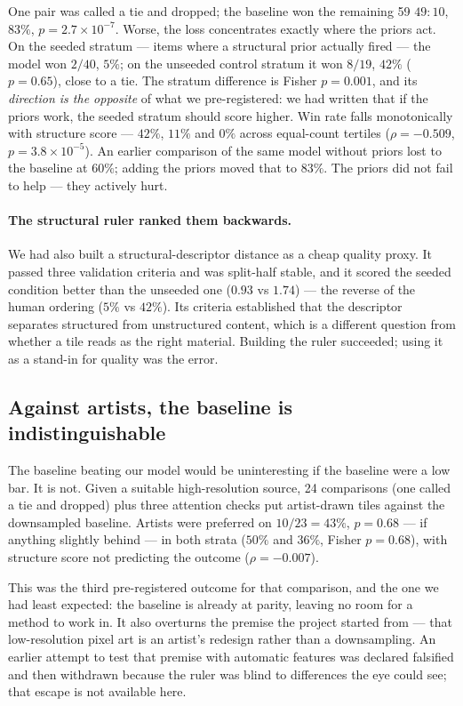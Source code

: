 \documentclass{article}
\begin{document}
One pair was called a tie and dropped; the baseline won the remaining 59
$49{:}10$, $83\%$, $p{=}2.7\times10^{-7}$. Worse, the loss concentrates
exactly where the priors act. On the seeded stratum --- items where a
structural prior actually fired --- the model won $2/40$, $5\%$; on the
unseeded control stratum it won $8/19$, $42\%$ ($p{=}0.65$), close to a tie.
The stratum difference is Fisher $p{=}0.001$, and its \emph{direction is the
opposite} of what we pre-registered: we had written that if the priors work,
the seeded stratum should score higher. Win rate falls monotonically with
structure score --- $42\%$, $11\%$ and $0\%$ across equal-count tertiles
($\rho{=}-0.509$, $p{=}3.8\times10^{-5}$). An earlier comparison of the same model
without priors lost to the baseline at $60\%$; adding the priors moved that to $83\%$.
The priors did not fail to help --- they actively hurt.

\paragraph{The structural ruler ranked them backwards.} We had also built a
structural-descriptor distance as a cheap quality proxy. It passed three
validation criteria and was split-half stable, and it scored the seeded
condition better than the unseeded one ($0.93$ vs $1.74$) --- the reverse of
the human ordering ($5\%$ vs $42\%$). Its criteria established that the
descriptor separates structured from unstructured content, which is a
different question from whether a tile reads as the right material. Building
the ruler succeeded; using it as a stand-in for quality was the error.

\subsection{Against artists, the baseline is indistinguishable}

The baseline beating our model would be uninteresting if the baseline were a
low bar. It is not. Given a suitable high-resolution source, 24 comparisons
(one called a tie and dropped) plus three attention checks put artist-drawn
tiles against the downsampled baseline. Artists were preferred on
$10/23 = 43\%$, $p{=}0.68$ --- if anything slightly behind --- in both strata
($50\%$ and $36\%$, Fisher $p{=}0.68$), with structure score not predicting
the outcome ($\rho{=}-0.007$).

This was the third pre-registered outcome for that comparison, and the one we
had least expected: the baseline is already at parity, leaving no room for a
method to work in. It also overturns the premise the project started from ---
that low-resolution pixel art is an artist's redesign rather than a
downsampling. An earlier attempt to test that premise with automatic features
was declared falsified and then withdrawn because the ruler was blind to
differences the eye could see; that escape is not available here.
\end{document}
